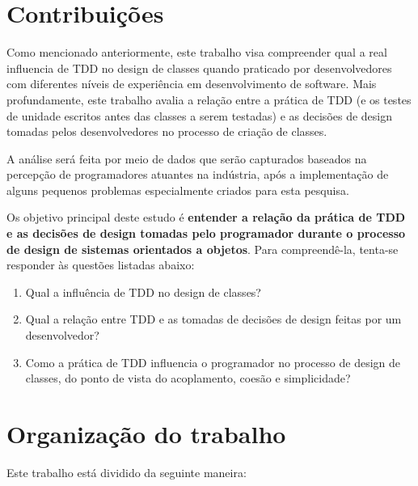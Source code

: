 
\section{Contribuições}

Como mencionado anteriormente, este trabalho
visa compreender qual a real influencia de TDD no design de classes quando praticado
por desenvolvedores com diferentes níveis de experiência em desenvolvimento de 
software.
Mais profundamente, este trabalho avalia a relação entre a prática de TDD (e os testes de unidade
escritos antes das classes a serem testadas) e as decisões de design tomadas 
pelos desenvolvedores no processo de criação de classes.

A análise será feita por meio de dados que serão
capturados baseados na percepção de programadores atuantes na indústria, após
a implementação de alguns pequenos problemas especialmente criados para
esta pesquisa.

Os objetivo principal deste estudo é \textbf{entender a relação da prática de TDD 
e as decisões de design tomadas pelo programador durante o processo de design de sistemas orientados a objetos}.
Para compreendê-la, tenta-se responder às questões listadas
abaixo:

\begin{enumerate}

	\item Qual a influência de TDD no design de classes?

	\item Qual a relação entre TDD e as tomadas de decisões de design
	feitas por um desenvolvedor?

	\item Como a prática de TDD influencia o programador no processo de  
	design de classes, do ponto de vista do acoplamento, coesão e simplicidade?

\end{enumerate}

\section{Organização do trabalho}

Este trabalho está dividido da seguinte maneira: 

